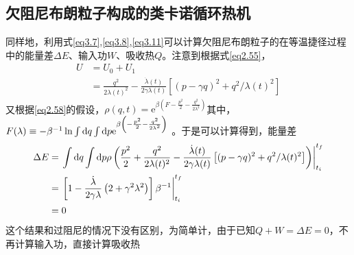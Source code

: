 \subsection{欠阻尼布朗粒子构成的类卡诺循环热机}
\qquad 同样地，利用式\eqref{eq3.7},\quad \eqref{eq3.8},\quad \eqref{eq3.11}可以计算欠阻尼布朗粒子的在等温捷径过程中的能量差$\Delta E$、输入功$W$、吸收热$Q$。注意到根据式\eqref{eq2.55}，
\begin{equation}
    \begin{split}
        U&=U_0 + U_1 \\
    &= \frac{q^2}{2 \lambda(t)^2}  - \frac{\dot{\lambda}(t)}{2 \gamma \lambda(t)}\left[(p-\gamma q)^{2}+ q^{2}/\lambda(t)^2\right]
    \end{split}  
    \label{eq3.34}
\end{equation}
又根据\eqref{eq2.58}的假设，$\rho(q, t)= \mathrm{e}^{{\beta\left(F - \frac{p^2}{2}-\frac{q^{2}}{2 \lambda^2}\right)}}$其中，$F(\lambda) \equiv-\beta^{-1} \ln  \int \mathrm{d} q \int \mathrm{d} p \mathrm{e}^{{\beta\left(-\frac{p^2}{2}-\frac{q^{2}}{2 \lambda^2}\right)}} $ 
。于是可以计算得到，能量差
\begin{equation}
    \begin{split}
        \Delta E&=\left.\int \mathrm{d} q \int \mathrm{d} p \rho \left( \frac{p^2}{2} + \frac{q^2}{2 \lambda(t)^2}  - \frac{\dot{\lambda}(t)}{2 \gamma \lambda(t)}\left[(p-\gamma q)^{2}+ q^{2}/\lambda(t)^2\right] \right)\right|_{t_{i}} ^{t_{f}}\\
        &=\left. \left[1-\frac{\dot{\lambda}}{2 \gamma \lambda}\left(2+\gamma^{2} \lambda^{2}\right)\right] \beta^{-1}\right|_{t_{i}} ^{t_{f}}\\
        &=0
    \end{split}
    \label{eq3.37}
\end{equation}
这个结果和过阻尼的情况下没有区别，为简单计，由于已知$Q + W = \Delta E =0$，不再计算输入功，直接计算吸收热
